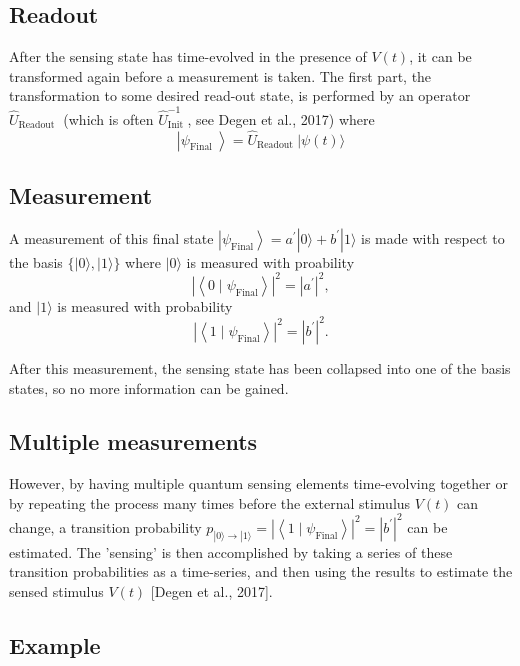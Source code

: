 \documentclass[%
oneside,                 %
final,                   %
10pt]{article}
\begin{document}
\subsection{Readout}

After the sensing state has time-evolved in the presence of $V(t)$, it
can be transformed again before a measurement is taken. The first
part, the transformation to some desired read-out state, is performed
by an operator $\hat{U}_{\text {Readout }}$ (which is often
$\hat{U}_{\text {Init }}^{-1}$, see Degen et al., 2017) where
\[
\left|\psi_{\text {Final }}\right\rangle=\hat{U}_{\text {Readout }}|\psi(t)\rangle
\]

\subsection{Measurement}

A measurement of this final state $\left|\psi_{\text {Final
}}\right\rangle=a^{\prime}|0\rangle+b^{\prime}|1\rangle$ is made with
respect to the basis $\{|0\rangle,|1\rangle\}$ where
$|0\rangle$ is measured with proability
\[
\left|\left\langle 0 \mid \psi_{\text {Final}}\right\rangle\right|^{2}=\left|a^{\prime}\right|^{2},
\]
and $|1\rangle$ is measured with probability 
\[
\left|\left\langle 1 \mid\psi_{\text {Final}}\right\rangle\right|^{2}=\left|b^{\prime}\right|^{2}.
\]

After this
measurement, the sensing state has been collapsed into one of the
basis states, so no more information can be gained.

\subsection{Multiple measurements}

However, by having
multiple quantum sensing elements time-evolving together or by
repeating the process many times before the external stimulus $V(t)$
can change, a transition probability $p_{|0\rangle
\rightarrow|1\rangle}=\left|\left\langle 1 \mid \psi_{\text {Final
}}\right\rangle\right|^{2}=\left|b^{\prime}\right|^{2}$ can be
estimated. The 'sensing' is then accomplished by taking a series of
these transition probabilities as a time-series, and then using the
results to estimate the sensed stimulus $V(t)$ [Degen et al., 2017].

\subsection{Example}
\end{document}
